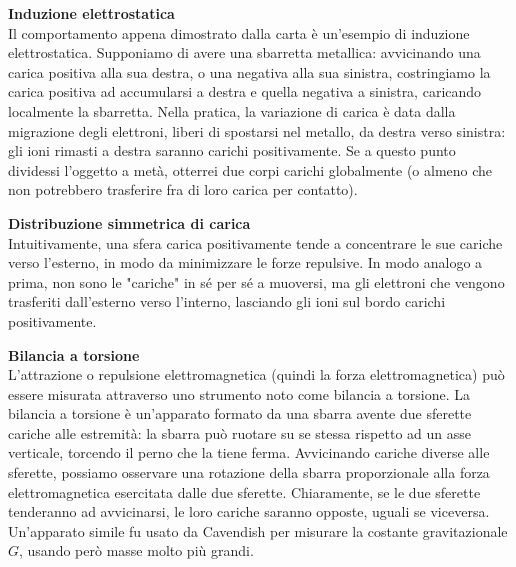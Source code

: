 \documentclass[a4paper,12pt]{article}
\begin{document}
\textbf{Induzione elettrostatica} \\
Il comportamento appena dimostrato dalla carta è un'esempio di induzione elettrostatica. Supponiamo di avere una sbarretta metallica:
avvicinando una carica positiva alla sua destra, o una negativa alla sua sinistra, costringiamo la carica positiva ad accumularsi a destra
e quella negativa a sinistra, caricando localmente la sbarretta. Nella pratica, la variazione di carica è data dalla migrazione degli elettroni,
liberi di spostarsi nel metallo, da destra verso sinistra: gli ioni rimasti a destra saranno carichi positivamente. Se a questo punto
dividessi l'oggetto a metà, otterrei due corpi carichi globalmente (o almeno che non potrebbero trasferire fra di loro carica per contatto).
\par\smallskip
\textbf{Distribuzione simmetrica di carica} \\
Intuitivamente, una sfera carica positivamente tende a concentrare le sue cariche verso l'esterno, in modo da minimizzare le forze repulsive. In modo analogo a prima,
non sono le "cariche" in sé per sé a muoversi, ma gli elettroni che vengono trasferiti dall'esterno verso l'interno, lasciando gli ioni sul bordo
carichi positivamente.
\par\smallskip
\textbf{Bilancia a torsione} \\
L'attrazione o repulsione elettromagnetica (quindi la forza elettromagnetica) può essere misurata attraverso 
uno strumento noto come bilancia a torsione. La bilancia a torsione è un'apparato formato da una sbarra avente due sferette cariche alle estremità:
la sbarra può ruotare su se stessa rispetto ad un asse verticale, torcendo il perno che la tiene ferma. Avvicinando cariche diverse alle sferette,
possiamo osservare una rotazione della sbarra proporzionale alla forza elettromagnetica esercitata dalle due sferette. Chiaramente, se le due sferette
tenderanno ad avvicinarsi, le loro cariche saranno opposte, uguali se viceversa. Un'apparato simile fu usato da Cavendish per misurare la costante gravitazionale
$G$, usando però masse molto più grandi.
\end{document}
